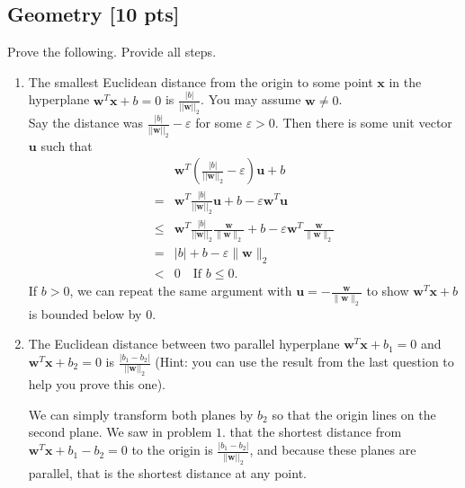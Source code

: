 \documentclass[a4paper]{article}
\theoremstyle{definition}
\newenvironment{soln}{
	\leavevmode\color{blue}\ignorespaces
}{}
\begin{document}
	\subsection{Geometry [10 pts]}
	Prove the following.  Provide all steps.
	\begin{enumerate}
		\item 	The smallest Euclidean distance from the origin to some point $\mathbf{x}$ in the hyperplane $\mathbf{w}^{T}\mathbf{x} + b = 0$ is $\frac{|b|}{||\mathbf{w}||_2}$.  You may assume $\mathbf{w} \neq 0$.\\
		\begin{soln}  Say the distance was $ \frac{|b|}{||\mathbf{w}||_2} - \varepsilon $ for some $ \varepsilon>0 $. Then there is some unit vector $ \mathbf{u} $ such that 
		\begin{align*}
			&\mathbf{w}^{T} (\frac{|b|}{||\mathbf{w}||_2} - \varepsilon) \mathbf{u} + b \\
			=& \mathbf{w}^{T} \frac{|b|}{||\mathbf{w}||_2} \mathbf{u} + b - \varepsilon\mathbf{w}^T\mathbf{u}\\
			\leq& \mathbf{w}^{T} \frac{|b|}{||\mathbf{w}||_2} \frac{ \mathbf{w}}{\| \mathbf{w} \|_2} + b - \varepsilon\mathbf{w}^T\frac{\mathbf{w}}{\| \mathbf{w} \|_2}\\
			=& |b| + b - \varepsilon \|\mathbf{w}\|_2\\
			<& 0 \quad \text{If } b\leq0.
		\end{align*}
		If $ b>0 $, we can repeat the same argument with $ \mathbf{u}=-\frac{\mathbf{w}}{\| \mathbf{w} \|_2} $ to show $ \mathbf{w}^{T}\mathbf{x} + b $ is bounded below by $ 0 $.
		\end{soln}
		
		\item 	The Euclidean distance between two parallel hyperplane $\mathbf{w}^{T}\mathbf{x} + b_1 = 0$ and $\mathbf{w}^{T}\mathbf{x} + b_2 = 0$ is $\frac{|b_1 - b_2|}{||\mathbf{w}||_2}$ (Hint: you can use the result from the last question to help you prove this one).
		
		\begin{soln}  We can simply transform both planes by $ b_2 $ so that the origin lines on the second plane. We saw in problem $ 1. $ that the shortest distance from $ \mathbf{w}^{T}\mathbf{x} + b_1 - b_2 = 0 $ to the origin is $ \frac{|b_1 - b_2|}{||\mathbf{w}||_2} $, and because these planes are parallel, that is the shortest distance at any point.
		\end{soln}
		
	\end{enumerate}
	
\end{document}
